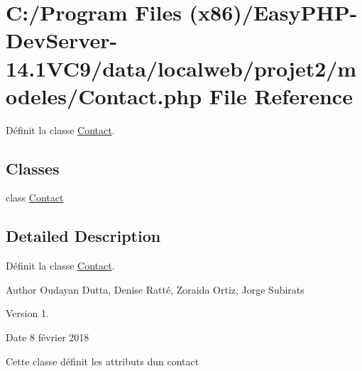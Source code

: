 \hypertarget{_contact_8php}{}\section{C\+:/\+Program Files (x86)/\+Easy\+P\+H\+P-\/\+Dev\+Server-\/14.1\+V\+C9/data/localweb/projet2/modeles/\+Contact.php File Reference}
\label{_contact_8php}


Définit la classe \hyperlink{class_contact}{Contact}.  


\subsection*{Classes}
\begin{DoxyCompactItemize}
\item 
class \hyperlink{class_contact}{Contact}
\end{DoxyCompactItemize}


\subsection{Detailed Description}
Définit la classe \hyperlink{class_contact}{Contact}. 

\begin{DoxyAuthor}{Author}
Oudayan Dutta, Denise Ratté, Zoraida Ortiz, Jorge Subirats 
\end{DoxyAuthor}
\begin{DoxyVersion}{Version}
1. 
\end{DoxyVersion}
\begin{DoxyDate}{Date}
8 février 2018
\end{DoxyDate}
Cette classe définit les attributs d\textquotesingle{}un contact 